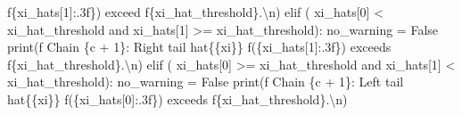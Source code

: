 \documentclass[
  letterpaper,
  DIV=11,
  numbers=noendperiod]{scrartcl}
\newenvironment{Shaded}{\begin{snugshade}}{\end{snugshade}}
\newcommand{\BuiltInTok}[1]{\textcolor[rgb]{0.00,0.23,0.31}{#1}}
\newcommand{\CharTok}[1]{\textcolor[rgb]{0.13,0.47,0.30}{#1}}
\newcommand{\ControlFlowTok}[1]{\textcolor[rgb]{0.00,0.23,0.31}{#1}}
\newcommand{\DecValTok}[1]{\textcolor[rgb]{0.68,0.00,0.00}{#1}}
\newcommand{\KeywordTok}[1]{\textcolor[rgb]{0.00,0.23,0.31}{#1}}
\newcommand{\NormalTok}[1]{\textcolor[rgb]{0.00,0.23,0.31}{#1}}
\newcommand{\OperatorTok}[1]{\textcolor[rgb]{0.37,0.37,0.37}{#1}}
\newcommand{\SpecialCharTok}[1]{\textcolor[rgb]{0.37,0.37,0.37}{#1}}
\newcommand{\SpecialStringTok}[1]{\textcolor[rgb]{0.13,0.47,0.30}{#1}}
\newcommand{\VariableTok}[1]{\textcolor[rgb]{0.07,0.07,0.07}{#1}}
\begin{document}
\begin{Shaded}
\begin{Highlighting}[]
            \SpecialStringTok{f\textquotesingle{}}\SpecialCharTok{\{}\NormalTok{xi\_hats[}\DecValTok{1}\NormalTok{]}\SpecialCharTok{:.3f\}}\SpecialStringTok{) exceed \textquotesingle{}}
            \SpecialStringTok{f\textquotesingle{}}\SpecialCharTok{\{}\NormalTok{xi\_hat\_threshold}\SpecialCharTok{\}}\SpecialStringTok{.}\CharTok{\textbackslash{}n}\SpecialStringTok{\textquotesingle{}}\NormalTok{)}
    \ControlFlowTok{elif}\NormalTok{ (    xi\_hats[}\DecValTok{0}\NormalTok{] }\OperatorTok{\textless{}}\NormalTok{ xi\_hat\_threshold }
          \KeywordTok{and}\NormalTok{ xi\_hats[}\DecValTok{1}\NormalTok{] }\OperatorTok{\textgreater{}=}\NormalTok{ xi\_hat\_threshold):}
\NormalTok{      no\_warning }\OperatorTok{=} \VariableTok{False}
      \BuiltInTok{print}\NormalTok{(}\SpecialStringTok{f\textquotesingle{}  Chain }\SpecialCharTok{\{}\NormalTok{c }\OperatorTok{+} \DecValTok{1}\SpecialCharTok{\}}\SpecialStringTok{: Right tail hat}\CharTok{\{\{}\SpecialStringTok{xi}\CharTok{\}\}}\SpecialStringTok{ \textquotesingle{}}
            \SpecialStringTok{f\textquotesingle{}(}\SpecialCharTok{\{}\NormalTok{xi\_hats[}\DecValTok{1}\NormalTok{]}\SpecialCharTok{:.3f\}}\SpecialStringTok{) exceeds \textquotesingle{}}
            \SpecialStringTok{f\textquotesingle{}}\SpecialCharTok{\{}\NormalTok{xi\_hat\_threshold}\SpecialCharTok{\}}\SpecialStringTok{.}\CharTok{\textbackslash{}n}\SpecialStringTok{\textquotesingle{}}\NormalTok{)}
    \ControlFlowTok{elif}\NormalTok{ (    xi\_hats[}\DecValTok{0}\NormalTok{] }\OperatorTok{\textgreater{}=}\NormalTok{ xi\_hat\_threshold }
          \KeywordTok{and}\NormalTok{ xi\_hats[}\DecValTok{1}\NormalTok{] }\OperatorTok{\textless{}}\NormalTok{ xi\_hat\_threshold):}
\NormalTok{      no\_warning }\OperatorTok{=} \VariableTok{False}
      \BuiltInTok{print}\NormalTok{(}\SpecialStringTok{f\textquotesingle{}  Chain }\SpecialCharTok{\{}\NormalTok{c }\OperatorTok{+} \DecValTok{1}\SpecialCharTok{\}}\SpecialStringTok{: Left tail hat}\CharTok{\{\{}\SpecialStringTok{xi}\CharTok{\}\}}\SpecialStringTok{ \textquotesingle{}}
            \SpecialStringTok{f\textquotesingle{}(}\SpecialCharTok{\{}\NormalTok{xi\_hats[}\DecValTok{0}\NormalTok{]}\SpecialCharTok{:.3f\}}\SpecialStringTok{) exceeds \textquotesingle{}}
            \SpecialStringTok{f\textquotesingle{}}\SpecialCharTok{\{}\NormalTok{xi\_hat\_threshold}\SpecialCharTok{\}}\SpecialStringTok{.}\CharTok{\textbackslash{}n}\SpecialStringTok{\textquotesingle{}}\NormalTok{)}
  

\end{Highlighting}
\end{Shaded}
\end{document}
